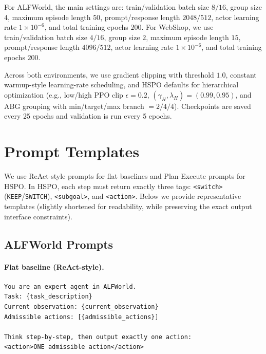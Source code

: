 \documentclass{article}
\begin{document}
For ALFWorld, the main settings are: train/validation batch size $8/16$, group size $4$, maximum episode length $50$, prompt/response length $2048/512$, actor learning rate $1\times 10^{-6}$, and total training epochs $200$. For WebShop, we use train/validation batch size $4/16$, group size $2$, maximum episode length $15$, prompt/response length $4096/512$, actor learning rate $1\times 10^{-6}$, and total training epochs $200$.

Across both environments, we use gradient clipping with threshold $1.0$, constant warmup-style learning-rate scheduling, and HSPO defaults for hierarchical optimization (e.g., low/high PPO clip $\epsilon=0.2$, $(\gamma_H,\lambda_H)=(0.99,0.95)$, and ABG grouping with min/target/max branch $=2/4/4$). Checkpoints are saved every 25 epochs and validation is run every 5 epochs.


\section{Prompt Templates}
\label{app:prompts}

We use ReAct-style prompts for flat baselines and Plan-Execute prompts for HSPO. In HSPO, each step must return exactly three tags:
\texttt{<switch>} (\texttt{KEEP}/\texttt{SWITCH}),
\texttt{<subgoal>}, and
\texttt{<action>}.
Below we provide representative templates (slightly shortened for readability, while preserving the exact output interface constraints).

\subsection{ALFWorld Prompts}
\label{app:alfworld_prompts}

\paragraph{Flat baseline (ReAct-style).}
\begin{lstlisting}
You are an expert agent in ALFWorld.
Task: {task_description}
Current observation: {current_observation}
Admissible actions: [{admissible_actions}]

Think step-by-step, then output exactly one action:
<action>ONE admissible action</action>
\end{lstlisting}
\end{document}

